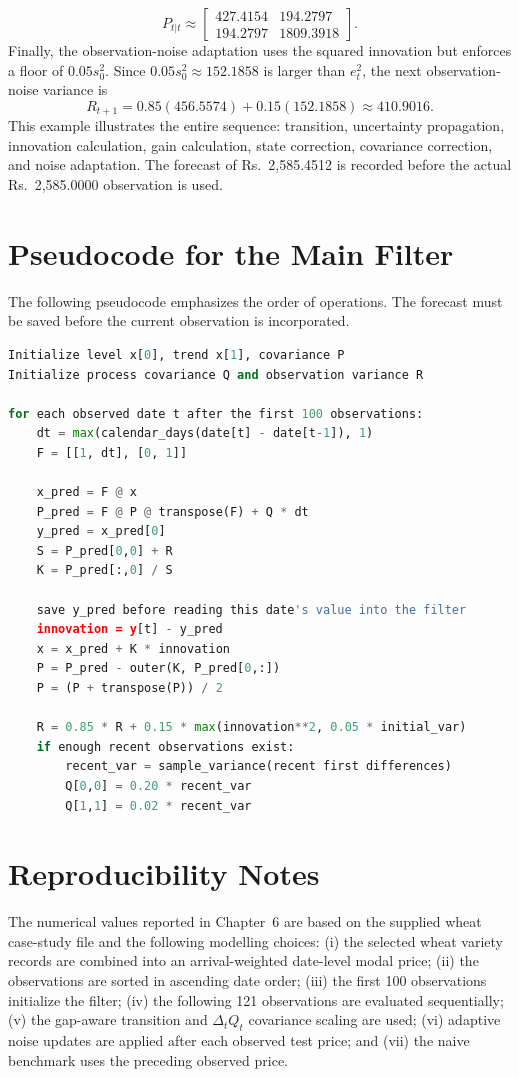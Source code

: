 \documentclass[12pt,a4paper,oneside]{report}
\numberwithin{equation}{chapter}
\numberwithin{figure}{chapter}
\numberwithin{table}{chapter}
\theoremstyle{definition}
\theoremstyle{plain}
\newcommand{\1}{\mathbf{1}}
\begin{document}
\[
P_{t|t}\approx\begin{bmatrix}427.4154&194.2797\\194.2797&1809.3918\end{bmatrix}.
\]
Finally, the observation-noise adaptation uses the squared innovation but enforces a floor of $0.05s_0^2$. Since $0.05s_0^2\approx152.1858$ is larger than $e_t^2$, the next observation-noise variance is
\[
R_{t+1}=0.85(456.5574)+0.15(152.1858)\approx410.9016.
\]
This example illustrates the entire sequence: transition, uncertainty propagation, innovation calculation, gain calculation, state correction, covariance correction, and noise adaptation. The forecast of Rs.\ 2,585.4512 is recorded before the actual Rs.\ 2,585.0000 observation is used.

\chapter{Pseudocode for the Main Filter}
The following pseudocode emphasizes the order of operations. The forecast must be saved before the current observation is incorporated.
\begin{lstlisting}[language=Python,caption={High-level adaptive gap-aware Kalman recursion}]
Initialize level x[0], trend x[1], covariance P
Initialize process covariance Q and observation variance R

for each observed date t after the first 100 observations:
    dt = max(calendar_days(date[t] - date[t-1]), 1)
    F = [[1, dt], [0, 1]]

    x_pred = F @ x
    P_pred = F @ P @ transpose(F) + Q * dt
    y_pred = x_pred[0]
    S = P_pred[0,0] + R
    K = P_pred[:,0] / S

    save y_pred before reading this date's value into the filter
    innovation = y[t] - y_pred
    x = x_pred + K * innovation
    P = P_pred - outer(K, P_pred[0,:])
    P = (P + transpose(P)) / 2

    R = 0.85 * R + 0.15 * max(innovation**2, 0.05 * initial_var)
    if enough recent observations exist:
        recent_var = sample_variance(recent first differences)
        Q[0,0] = 0.20 * recent_var
        Q[1,1] = 0.02 * recent_var
\end{lstlisting}

\chapter{Reproducibility Notes}
The numerical values reported in Chapter~6 are based on the supplied wheat case-study file and the following modelling choices: (i) the selected wheat variety records are combined into an arrival-weighted date-level modal price; (ii) the observations are sorted in ascending date order; (iii) the first 100 observations initialize the filter; (iv) the following 121 observations are evaluated sequentially; (v) the gap-aware transition and $\Delta_tQ_t$ covariance scaling are used; (vi) adaptive noise updates are applied after each observed test price; and (vii) the naive benchmark uses the preceding observed price.
\end{document}

